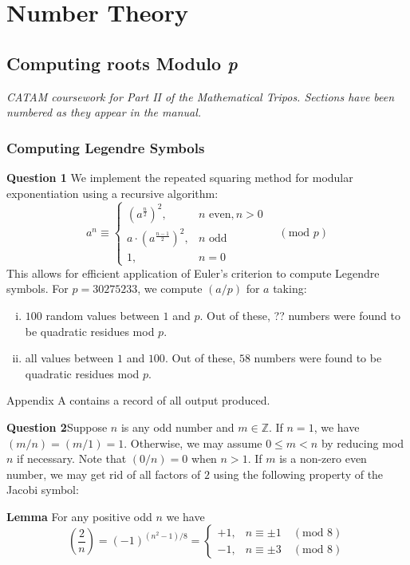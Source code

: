 \documentclass[12pt]{article}
\newcommand{\mathmod}[1]{\quad(\text{mod }#1)}
\begin{document}
\setcounter{section}{14}
\section{Number Theory}
\setcounter{subsection}{5}
\subsection{Computing roots Modulo \textit{p}}
\emph{CATAM coursework for Part II of the Mathematical Tripos. Sections have
been numbered as they appear in the manual.}

\setcounter{subsubsection}{1}
\subsubsection{Computing Legendre Symbols}
\textbf{Question 1} \quad 
We implement the repeated squaring method for modular exponentiation using a
recursive algorithm: 
\[a^n \equiv \begin{cases}
    (a^{\frac{n}{2}})^2, &n\text{ even}, n>0\\
    a\cdot (a^{\frac{n-1}{2}})^2, &n\text{ odd}\\
    1, &n = 0
\end{cases} \quad (\text{mod } p)\]
This allows for efficient application of Euler's criterion to compute Legendre
symbols. For \(p=30275233\), we compute \((a/p)\) for \(a\) taking:
\begin{enumerate}[(i)]
    \item \(100\) random values between \(1\) and \(p\). Out of these, ?? numbers
        were found to be quadratic residues mod \(p\).
    \item all values between \(1\) and \(100\). Out of these, \(58\) numbers
        were found to be quadratic residues mod \(p\).
\end{enumerate}
Appendix A contains a record of all output produced.

 \hfill

\textbf{Question 2}\quad Suppose \(n\) is any odd number and \(m\in
\mathbb{Z}\).  If \(n=1\), we have \((m/n)=(m/1)=1\). Otherwise, we may assume
\(0\leq m < n\) by reducing mod \(n\) if necessary. Note that \((0/n)=0\) when
\(n>1\). If \(m\) is a non-zero even number, we may get rid of
all factors of \(2\) using the following property of the Jacobi symbol:

\textbf{Lemma} For any positive odd \(n\) we have
\[\left(\frac{2}{n}\right) = (-1)^{(n^2-1)/8}= \begin{cases} +1, &n \equiv \pm1
    \mathmod{8} \\ 
-1, &n\equiv \pm 3 \mathmod{8}\end{cases}\]
\end{document}
